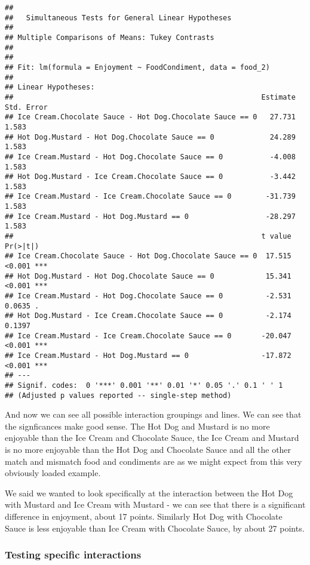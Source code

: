 \documentclass[]{book}
\begin{document}
\begin{verbatim}
## 
##   Simultaneous Tests for General Linear Hypotheses
## 
## Multiple Comparisons of Means: Tukey Contrasts
## 
## 
## Fit: lm(formula = Enjoyment ~ FoodCondiment, data = food_2)
## 
## Linear Hypotheses:
##                                                          Estimate Std. Error
## Ice Cream.Chocolate Sauce - Hot Dog.Chocolate Sauce == 0   27.731      1.583
## Hot Dog.Mustard - Hot Dog.Chocolate Sauce == 0             24.289      1.583
## Ice Cream.Mustard - Hot Dog.Chocolate Sauce == 0           -4.008      1.583
## Hot Dog.Mustard - Ice Cream.Chocolate Sauce == 0           -3.442      1.583
## Ice Cream.Mustard - Ice Cream.Chocolate Sauce == 0        -31.739      1.583
## Ice Cream.Mustard - Hot Dog.Mustard == 0                  -28.297      1.583
##                                                          t value Pr(>|t|)    
## Ice Cream.Chocolate Sauce - Hot Dog.Chocolate Sauce == 0  17.515   <0.001 ***
## Hot Dog.Mustard - Hot Dog.Chocolate Sauce == 0            15.341   <0.001 ***
## Ice Cream.Mustard - Hot Dog.Chocolate Sauce == 0          -2.531   0.0635 .  
## Hot Dog.Mustard - Ice Cream.Chocolate Sauce == 0          -2.174   0.1397    
## Ice Cream.Mustard - Ice Cream.Chocolate Sauce == 0       -20.047   <0.001 ***
## Ice Cream.Mustard - Hot Dog.Mustard == 0                 -17.872   <0.001 ***
## ---
## Signif. codes:  0 '***' 0.001 '**' 0.01 '*' 0.05 '.' 0.1 ' ' 1
## (Adjusted p values reported -- single-step method)
\end{verbatim}

And now we can see all possible interaction groupings and lines. We can see that the signficances make good sense. The Hot Dog and Mustard is no more enjoyable than the Ice Cream and Chocolate Sauce, the Ice Cream and Mustard is no more enjoyable than the Hot Dog and Chocolate Sauce and all the other match and mismatch food and condiments are as we might expect from this very obviously loaded example.

We said we wanted to look specifically at the interaction between the Hot Dog with Mustard and Ice Cream with Mustard - we can see that there is a significant difference in enjoyment, about 17 points. Similarly Hot Dog with Chocolate Sauce is less enjoyable than Ice Cream with Chocolate Sauce, by about 27 points.

\hypertarget{testing-specific-interactions}{%
\subsubsection{Testing specific interactions}\label{testing-specific-interactions}}
\end{document}
